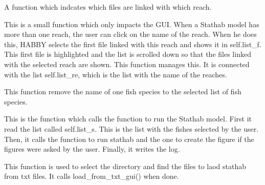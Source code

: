\documentclass[letterpaper,10pt,english]{sphinxmanual}
\begin{document}
\begin{fulllineitems}

\begin{fulllineitems}
\label{\detokenize{index:src_GUI.stathab_GUI.StathabW.reach_selected}}
A function which indcates which files are linked with which reach.


This is a small function which only impacts the GUI. When a Stathab model has more than one reach,
the user can click on the name of the reach. When he does this, HABBY selects the first file linked
with this reach and shows it in self.list\_f. This first file is highlighted and the list is scrolled
down so that the files linked with the selected reach are shown. This function manages this. It is connected
with the list self.list\_re, which is the list with the name of the reaches.

\end{fulllineitems}


\begin{fulllineitems}
\label{\detokenize{index:src_GUI.stathab_GUI.StathabW.remove_fish}}
This function remove the name of one fish species to the selected list of fish species.

\end{fulllineitems}


\begin{fulllineitems}
\label{\detokenize{index:src_GUI.stathab_GUI.StathabW.run_stathab_gui}}
This is the function which calls the function to run the Stathab model.  First it read the list called
self.list\_s. This is the list with the fishes selected by the user. Then, it calls the function to run
stathab and the one to create the figure if the figures were asked by the user. Finally, it writes the log.

\end{fulllineitems}


\begin{fulllineitems}
\label{\detokenize{index:src_GUI.stathab_GUI.StathabW.select_dir}}
This function is used to select the directory and find the files to laod stathab from txt files. It calls
load\_from\_txt\_gui() when done.


\end{fulllineitems}
\end{fulllineitems}
\end{document}
